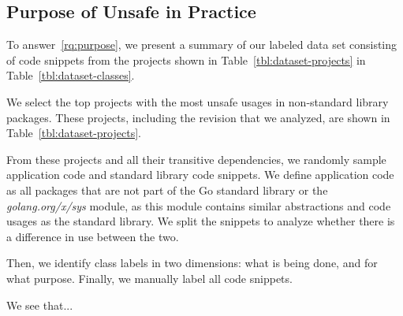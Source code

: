 


\subsection{Purpose of Unsafe in Practice}

To answer~\ref{rq:purpose}, we present a summary of our labeled data set consisting of  code snippets from the  projects shown in Table~\ref{tbl:dataset-projects} in Table~\ref{tbl:dataset-classes}.



We select the top  projects with the most unsafe usages in non-standard library packages.
These projects, including the revision that we analyzed, are shown in Table~\ref{tbl:dataset-projects}.

From these projects and all their transitive dependencies, we randomly sample  application code and  standard library code snippets. We define application code as all packages that are not part of the Go standard library or the \textit{golang.org/x/sys} module, as this module contains similar abstractions and code usages as the standard library. We split the snippets to analyze whether there is a difference in use between the two.

Then, we identify class labels in two dimensions: what is being done, and for what purpose. Finally, we manually label all  code snippets.



We see that...
